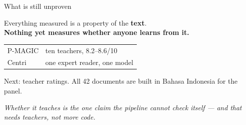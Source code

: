\documentclass[aspectratio=169,10pt]{beamer}
\newcommand{\takeaway}[1]{\vfill{\footnotesize\itshape\color{cGrey}#1\par}}
\begin{document}
\begin{frame}{What is still unproven}
\vfill
\begin{center}
\begin{tcolorbox}[colback=cAccent!6,colframe=cAccent,boxsep=2pt,left=8pt,right=8pt,top=5pt,bottom=5pt,width=0.92\textwidth]
\centering Everything measured is a property of the \textbf{text}.\\
\textbf{Nothing yet measures whether anyone learns from it.}
\end{tcolorbox}
\end{center}
\vfill
\begin{center}
\small
\begin{tabular}{@{}ll@{}}
P-MAGIC & ten teachers, 8.2--8.6/10 \\
Centri & one expert reader, one model \\
\end{tabular}
\end{center}
\vfill
\begin{center}
{\footnotesize Next: teacher ratings. All 42 documents are built in Bahasa Indonesia for the panel.}
\end{center}
\vfill
\takeaway{Whether it \emph{teaches} is the one claim the pipeline cannot check itself --- and that
needs teachers, not more code.}
\end{frame}
\end{document}
